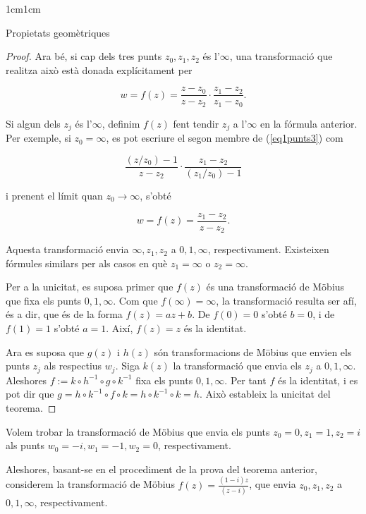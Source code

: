 \begin{adjustwidth}{1cm}{1cm}
\begin{subsection}{Propietats geomètriques}
\begin{proof}
        Ara bé, si cap dels tres punts $z_0, z_1, z_2$ és l'$\infty$, una transformació que realitza això està donada explícitament per

        \begin{equation}
            w = f(z) = \frac{z - z_0}{z - z_2} \cdot \frac{z_1 - z_2}{z_1 - z_0}.
            \label{eq1punts3}
        \end{equation}

        Si algun dels $z_j$ és l'$\infty$, definim $f(z)$ fent tendir $z_j$ a l'$\infty$ en la fórmula anterior. Per exemple, si $z_0 = \infty$, es pot escriure el segon membre de (\ref{eq1punts3}) com

        \[
            \frac{(z/z_0) - 1}{z - z_2} \cdot \frac{z_1 - z_2}{(z_1/z_0) - 1}
        \]

        i prenent el límit quan $z_0 \to \infty$, s'obté

        \[
            w = f(z) = \frac{z_1 - z_2}{z - z_2}.
        \]

        Aquesta transformació envia $\infty, z_1, z_2$ a $0,1,\infty$, respectivament. Existeixen fórmules similars per als casos en què $z_1 = \infty$ o $z_2 = \infty$.

        Per a la unicitat, es suposa primer que $f(z)$ és una transformació de Möbius que fixa els punts $0,1,\infty$. Com que $f(\infty)=\infty$, la transformació resulta ser afí, és a dir, que és de la forma $f(z)=az+b$. De $f(0)=0$ s'obté $b=0$, i de $f(1)=1$ s'obté $a=1$. Així, $f(z)=z$ és la identitat.

        Ara es suposa que $g(z)$ i $h(z)$ són transformacions de Möbius que envien els punts $z_j$ als respectius $w_j$. Siga $k(z)$ la transformació que envia els $z_j$ a $0,1,\infty$. Aleshores $f := k \circ h^{-1} \circ g \circ k^{-1}$ fixa els punts $0,1,\infty$. Per tant $f$ és la identitat, i es pot dir que $g = h \circ k^{-1} \circ f \circ k = h \circ k^{-1} \circ k = h$. Això estableix la unicitat del teorema.
    \end{proof}

    \begin{exemple}
        Volem trobar la transformació de Möbius que envia els punts $z_0=0, z_1=1, z_2=i$ als punts $w_0=-i,w_1=-1,w_2=0$, respectivament.

        Aleshores, basant-se en el procediment de la prova del teorema anterior, considerem la transformació de Möbius $f(z)=\frac{(1-i)z}{(z-i)}$, que envia $z_0,z_1,z_2$ a $0,1,\infty$, respectivament.


\end{exemple}
\end{subsection}
\end{adjustwidth}
